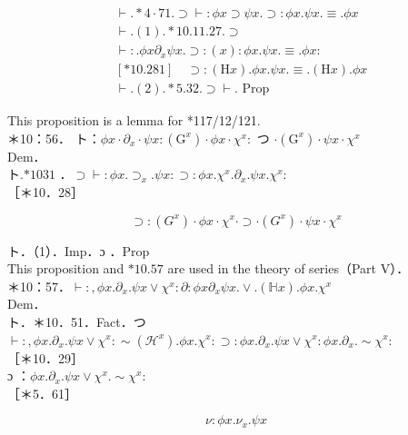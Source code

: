 \documentclass[10pt]{article}
\begin{document}
\begin{align*}
& \vdash . * 4 \cdot 71 . \supset \vdash: \phi x \supset \psi x . \supset: \phi x . \psi x . \equiv . \phi x  \tag{1}\\
& \vdash .(1) . * 10.11 .27 . \supset \\
& \vdash: . \phi x \partial_{x} \psi x . \supset:(x): \phi x . \psi x . \equiv . \phi x: \\
& {[* 10.281] \quad \supset:(\mathrm{H} x) . \phi x . \psi x . \equiv .(\mathrm{H} x) . \phi x}  \tag{2}\\
& \vdash .(2) . * 5.32 . \supset \vdash . \text { Prop }
\end{align*}


This proposition is a lemma for *117/12/121.\\
＊10：56． ト：$\phi x \cdot \partial_{x} \cdot \psi x:\left(\mathrm{G}^{x}\right) \cdot \phi x \cdot \chi^{x}:$ つ $\cdot\left(\mathrm{G}^{x}\right) \cdot \psi x \cdot \chi^{x}$\\
Dem．\\
ト.$* 1031$ ．$\supset \vdash: \phi x . \supset_{x} . \psi x: \supset: \phi x . \chi^{x} . \partial_{x} . \psi x . \chi^{x}:$\\
［＊10．28］


\begin{equation*}
\supset:\left(G^{x}\right) \cdot \phi x \cdot \chi^{x} \cdot \supset \cdot\left(G^{x}\right) \cdot \psi x \cdot \chi^{x} \tag{1}
\end{equation*}


ト．（1）．Imp．ɔ ．Prop\\
This proposition and $* 10.57$ are used in the theory of series（Part V）．\\
＊10：57．$\vdash:, \phi x . \partial_{x} . \psi x \vee \chi^{x}: \partial: \phi x \partial_{x} \psi x . \vee .(\mathbb{H} x) . \phi x . \chi^{x}$\\
Dem．\\
ト．＊10．51．Fact．つ\\
$\vdash:, \phi x . \partial_{x} . \psi x \vee \chi^{x}: \sim\left(\mathcal{H}^{x}\right) . \phi x . \chi^{x}: \supset: \phi x . \partial_{x} . \psi x \vee \chi^{x}: \phi x . \partial_{x} . \sim \chi^{x}:$\\
［＊10．29］\\
ɔ ：$\phi x . \partial_{x} . \psi x \vee \chi^{x} . \sim \chi^{x}:$\\
［＊5．61］


\begin{equation*}
\nu: \phi x . \nu_{x} . \psi x \tag{1}
\end{equation*}
\end{document}
